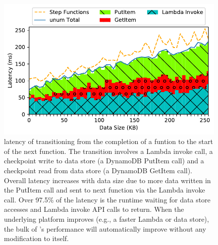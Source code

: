 \begin{figure}[t!]
    \centering
    \includegraphics[width=\columnwidth]{figures/TotalAdditionalLatencyNBreakdown.pdf}
    \caption{\name{} latency of transitioning from the completion of a funtion
    to the start of the next function. The transition involves a Lambda
    invoke call, a checkpoint write to data store (a DynamoDB PutItem call)
    and a checkpoint read from data store (a DynamoDB GetItem call). Overall
    latency increases with data size due to more data written in the PutItem
    call and sent to next function via the Lambda invoke call. Over 97.5\% of
    the latency is the
    \name{} runtime waiting for data store accesses and Lambda invoke API
    calls to return. When the underlying platform improves (e.g., a faster
    Lambda or data store), the bulk of \name{}'s performance will
    automatically improve without any modification to \name{} itself.}
    \label{fig:single-transition-latency-breakdown}
\end{figure}


